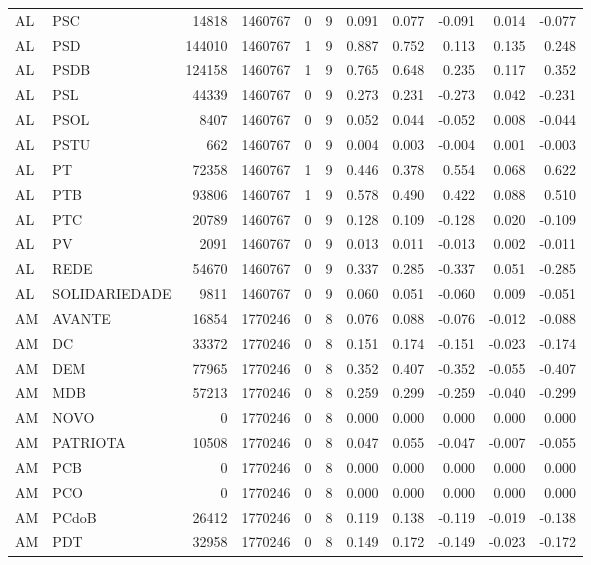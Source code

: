 \begin{landscape}
\begin{longtable}{llrrrrrrrrr}
AL & PSC & 14818 & 1460767 & 0 & 9 & 0.091 & 0.077 & -0.091 & 0.014 & -0.077 \\
AL & PSD & 144010 & 1460767 & 1 & 9 & 0.887 & 0.752 & 0.113 & 0.135 & 0.248 \\
AL & PSDB & 124158 & 1460767 & 1 & 9 & 0.765 & 0.648 & 0.235 & 0.117 & 0.352 \\
AL & PSL & 44339 & 1460767 & 0 & 9 & 0.273 & 0.231 & -0.273 & 0.042 & -0.231 \\
AL & PSOL & 8407 & 1460767 & 0 & 9 & 0.052 & 0.044 & -0.052 & 0.008 & -0.044 \\
AL & PSTU & 662 & 1460767 & 0 & 9 & 0.004 & 0.003 & -0.004 & 0.001 & -0.003 \\
AL & PT & 72358 & 1460767 & 1 & 9 & 0.446 & 0.378 & 0.554 & 0.068 & 0.622 \\
AL & PTB & 93806 & 1460767 & 1 & 9 & 0.578 & 0.490 & 0.422 & 0.088 & 0.510 \\
AL & PTC & 20789 & 1460767 & 0 & 9 & 0.128 & 0.109 & -0.128 & 0.020 & -0.109 \\
AL & PV & 2091 & 1460767 & 0 & 9 & 0.013 & 0.011 & -0.013 & 0.002 & -0.011 \\
AL & REDE & 54670 & 1460767 & 0 & 9 & 0.337 & 0.285 & -0.337 & 0.051 & -0.285 \\
AL & SOLIDARIEDADE & 9811 & 1460767 & 0 & 9 & 0.060 & 0.051 & -0.060 & 0.009 & -0.051 \\
AM & AVANTE & 16854 & 1770246 & 0 & 8 & 0.076 & 0.088 & -0.076 & -0.012 & -0.088 \\
AM & DC & 33372 & 1770246 & 0 & 8 & 0.151 & 0.174 & -0.151 & -0.023 & -0.174 \\
AM & DEM & 77965 & 1770246 & 0 & 8 & 0.352 & 0.407 & -0.352 & -0.055 & -0.407 \\
AM & MDB & 57213 & 1770246 & 0 & 8 & 0.259 & 0.299 & -0.259 & -0.040 & -0.299 \\
AM & NOVO & 0 & 1770246 & 0 & 8 & 0.000 & 0.000 & 0.000 & 0.000 & 0.000 \\
AM & PATRIOTA & 10508 & 1770246 & 0 & 8 & 0.047 & 0.055 & -0.047 & -0.007 & -0.055 \\
AM & PCB & 0 & 1770246 & 0 & 8 & 0.000 & 0.000 & 0.000 & 0.000 & 0.000 \\
AM & PCO & 0 & 1770246 & 0 & 8 & 0.000 & 0.000 & 0.000 & 0.000 & 0.000 \\
AM & PCdoB & 26412 & 1770246 & 0 & 8 & 0.119 & 0.138 & -0.119 & -0.019 & -0.138 \\
AM & PDT & 32958 & 1770246 & 0 & 8 & 0.149 & 0.172 & -0.149 & -0.023 & -0.172 \\

\end{longtable}
\end{landscape}

